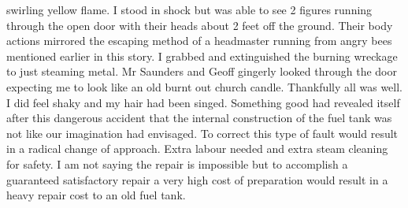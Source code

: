 swirling yellow flame. I stood in shock but was able to see 2 figures running
through the open door with their heads about 2 feet off the ground. Their body
actions mirrored the escaping method of a headmaster running from angry bees
mentioned earlier in this story. I grabbed and extinguished the burning
wreckage to just steaming metal. Mr Saunders and Geoff gingerly looked through
the door expecting me to look like an old burnt out church candle. Thankfully
all was well. I did feel shaky and my hair had been singed. Something good had
revealed itself after this dangerous accident that the internal construction of
the fuel tank was not like our imagination had envisaged. To correct this type
of fault would result in a radical change of approach. Extra labour needed and
extra steam cleaning for safety. I am not saying the repair is impossible but
to accomplish a guaranteed satisfactory repair a very high cost of preparation
would result in a heavy repair cost to an old fuel tank.
